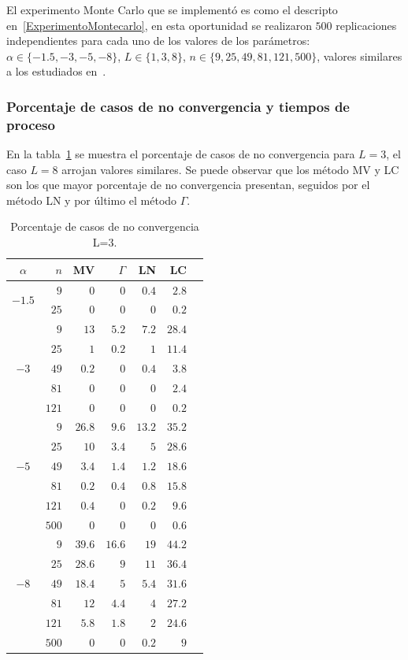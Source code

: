 El experimento Monte Carlo que se implementó es como el descripto en~\ref{ExperimentoMontecarlo}, en esta oportunidad se realizaron $500$ replicaciones independientes para cada uno de los valores de los parámetros: 
$\alpha\in\{-1.5, -3, -5, -8\}$, $L\in\{1,3,8\}$, $n\in\{9, 25,49, 81,121,500\}$, valores similares a los estudiados en~\cite{gambini2015}. 

\subsubsection{Porcentaje de casos de no convergencia y tiempos de proceso}
En la tabla~\ref{NoConvMLyNGyLNyLC_L=3} se muestra el porcentaje de casos de no convergencia para $L=3$, el caso $L=8$ arrojan valores similares. Se puede observar que los método MV y LC son los que mayor porcentaje de no convergencia presentan, seguidos por el método LN y por último el método $\Gamma$. 

\begin{table}[hbt]
	\caption{Porcentaje de casos de no convergencia  L=$3$.}
	\centering
	\label{NoConvMLyNGyLNyLC_L=3}
	\begin{tabular}{c*6{r}}
			\toprule		
			$\alpha$ & $n$ & MV & $\Gamma$ & LN &  LC\\
			\midrule
			\multirow{2 }{*}{$-1.5$} 
			&   $9$ & $0$ & $0$ & $0.4$ &  $2.8$\\
			&  $25$ & $0$ & $0$ & $0$ & $0.2$\\
			\midrule
			\multirow{5 }{*}{$-3$} 
			&   $9$ & $13$    & $5.2$  & $7.2$  &  $28.4$\\ 
			&  $25$ & $1$     & $0.2$  & $1$    &  $11.4$\\
			&  $49$ & $0.2$   & $0$    & $0.4$  & $3.8$\\ 
			&  $81$ & $0$     & $0$    & $0$    & $2.4$\\ 
			& $121$ & $0$     & $0$    & $0$    & $0.2$\\ 
			\midrule
			\multirow{5 }{*}{$-5$} 
			&   $9$ & $26.8$  & $9.6$  & $13.2$ &  $35.2$\\ 
			&  $25$ & $10$    & $3.4$  & $5$    & $28.6$\\ 
			&  $49$ & $3.4$   & $1.4$  & $1.2$  & $18.6$\\ 
			&  $81$ & $0.2$   & $0.4$  & $0.8$  & $15.8$\\ 
			& $121$ & $0.4$   & $0$    & $0.2$  & $9.6$\\ 
			& $500$ & $0$     & $0$    & $0$    & $0.6$\\ 
			\midrule
			\multirow{5 }{*}{$-8$} 
			&   $9$  & $39.6$ & $16.6$ & $19$   & $44.2$\\ 
			&  $25$  & $28.6$ & $9$    & $11$   & $36.4$\\ 
			&  $49$  & $18.4$ & $5$    & $5.4$  & $31.6$\\ 
			&  $81$  & $12$   & $4.4$  & $4$    & $27.2$\\ 
			& $121$  & $5.8$  & $1.8$  & $2$    & $24.6$\\ 
			& $500$  & $0$    & $0$    & $0.2$  & $9$\\
			\bottomrule 	
		\end{tabular}
\end{table}	

